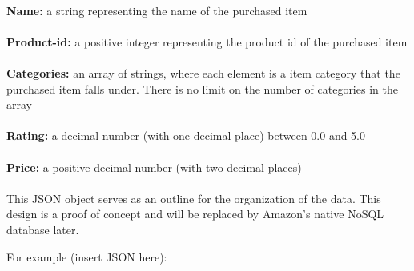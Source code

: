 \documentclass[12pt,a4paper]{article}
\begin{document}
		\\
		\textbf{Name:}  a string representing the name of the purchased item \\
		\\
		\textbf{Product-id:} a positive integer representing the product id of the 
		purchased item\\
		\\
		\textbf{Categories:} an array of strings, where each element is a item category that the purchased item falls under. There is no limit on the number of categories in the array\\
		\\
		\textbf{Rating:} a decimal number (with one decimal place) between 0.0 and 5.0\\
		\\
		\textbf{Price:} a positive decimal number (with two decimal places)\\
		\\
		This JSON object serves as an outline for the organization of the data. This design is a proof of concept and will be replaced by Amazon's native NoSQL database later.  
		
		For example (insert JSON here):
		\\\\
\end{document}
